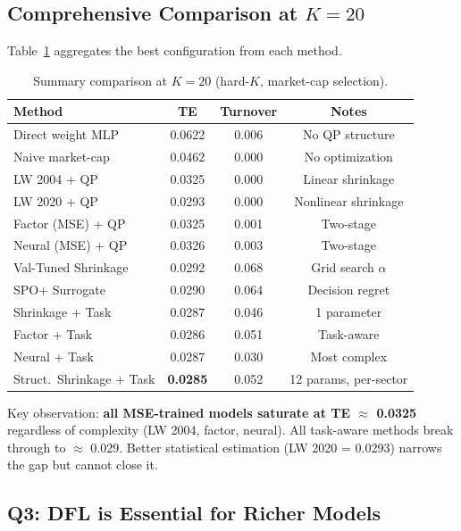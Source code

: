 \documentclass[11pt]{article}
\begin{document}
\subsection{Comprehensive Comparison at $K=20$}

Table~\ref{tab:summary} aggregates the best configuration from each method.

\begin{table}[t]
\centering
\caption{Summary comparison at $K = 20$ (hard-$K$, market-cap selection).}
\label{tab:summary}
\small
\begin{tabular}{@{}lccc@{}}
\toprule
Method & TE & Turnover & Notes \\
\midrule
Direct weight MLP   & 0.0622 & 0.006 & No QP structure \\
Naive market-cap    & 0.0462 & 0.000 & No optimization \\
LW 2004 + QP        & 0.0325 & 0.000 & Linear shrinkage \\
LW 2020 + QP        & 0.0293 & 0.000 & Nonlinear shrinkage \\
Factor (MSE) + QP   & 0.0325 & 0.001 & Two-stage \\
Neural (MSE) + QP   & 0.0326 & 0.003 & Two-stage \\
\midrule
Val-Tuned Shrinkage & 0.0292 & 0.068 & Grid search $\alpha$ \\
SPO+ Surrogate      & 0.0290 & 0.064 & Decision regret \\
\midrule
Shrinkage + Task    & 0.0287 & 0.046 & 1 parameter \\
Factor + Task       & 0.0286 & 0.051 & Task-aware \\
Neural + Task       & 0.0287 & 0.030 & Most complex \\
Struct.\ Shrinkage + Task & \textbf{0.0285} & 0.052 & 12 params, per-sector \\
\bottomrule
\end{tabular}
\end{table}

Key observation: \textbf{all MSE-trained models saturate at TE $\approx$ 0.0325} regardless of complexity (LW 2004, factor, neural). All task-aware methods break through to $\approx$ 0.029. Better statistical estimation (LW 2020 = 0.0293) narrows the gap but cannot close it.

\subsection{Q3: DFL is Essential for Richer Models}
\end{document}
